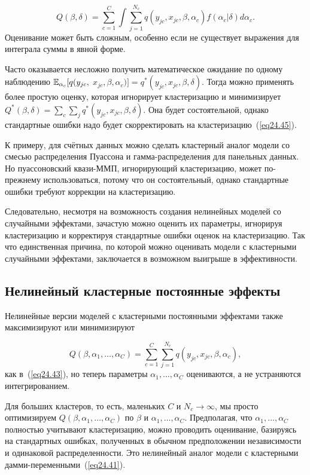 $$
Q(\beta, \delta) = \sum_{c=1}^C \int \sum_{j=1}^{N_c} q(y_{jc}, x_{jc}, \beta, \alpha_c) f(\alpha_c|\delta) d \alpha_c.
$$
Оценивание может быть сложным, особенно если не существует выражения для интеграла суммы в явной форме. 

Часто оказывается несложно получить математическое ожидание по одному наблюдению $\mathbb{E}_{\alpha_c} [q(y_{jc},$ $x_{jc}, \beta, \alpha_c)] = q^* (y_{jc}, x_{jc}, \beta, \delta)$. Тогда можно применять более простую оценку, которая игнорирует кластеризацию и минимизирует $Q^*(\beta, \delta) = \sum_c \sum_j q^* (y_{jc}, x_{jc}, \beta, \delta)$. Она будет состоятельной, однако стандартные ошибки надо будет скорректировать на кластеризацию~(\ref{eq24.45}). 

К примеру, для счётных данных можно сделать кластерный аналог модели со смесью распределения Пуассона и гамма-распределения для панельных данных. Но пуассоновский квази-ММП, игнорирующий кластеризацию, может по-прежнему использоваться, потому что он состоятельный, однако стандартные ошибки требуют коррекции на кластеризацию. 

Следовательно, несмотря на возможность создания нелинейных моделей со случайными эффектами, зачастую можно оценить их параметры, игнорируя кластеризацию и корректируя стандартные ошибки оценок на кластеризацию. Так что единственная причина, по которой можно оценивать модели с кластерными случайными эффектами, заключается в возможном выигрыше в эффективности. 

\subsection*{Нелинейный кластерные постоянные эффекты}

Нелинейные версии моделей с кластерными постоянными эффектами также максимизируют или минимизируют 

$$
Q(\beta, \alpha_1, \dots, \alpha_C) = \sum_{c=1}^C \sum_{j=1}^{N_c} q(y_{jc}, x_{jc}, \beta, \alpha_c),
$$
как в~(\ref{eq24.43}), но теперь параметры $\alpha_1, \dots, \alpha_C$ оцениваются, а не устраняются интегрированием. 

Для больших кластеров, то есть, маленьких $C$ и $N_c \to \infty$, мы просто оптимизируем $Q(\beta, \alpha_1, \dots, \alpha_C)$ по $\beta$ и $\alpha_1, \dots, \alpha_C$. Предполагая, что $\alpha_1, \dots, \alpha_C$ полностью учитывают кластеризацию, можно проводить оценивание, базируясь на стандартных ошибках, полученных в обычном предположении независимости и одинаковой распределенности. Это нелинейный аналог модели с кластерными дамми-переменными~(\ref{eq24.41}).

